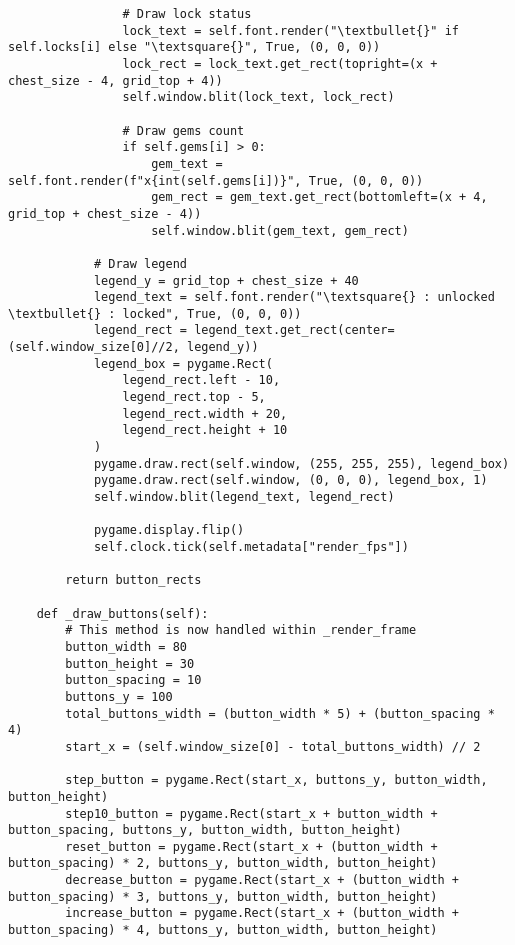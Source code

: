 \begin{lstlisting}
                # Draw lock status
                lock_text = self.font.render("\textbullet{}" if self.locks[i] else "\textsquare{}", True, (0, 0, 0))
                lock_rect = lock_text.get_rect(topright=(x + chest_size - 4, grid_top + 4))
                self.window.blit(lock_text, lock_rect)
                
                # Draw gems count
                if self.gems[i] > 0:
                    gem_text = self.font.render(f"x{int(self.gems[i])}", True, (0, 0, 0))
                    gem_rect = gem_text.get_rect(bottomleft=(x + 4, grid_top + chest_size - 4))
                    self.window.blit(gem_text, gem_rect)
            
            # Draw legend
            legend_y = grid_top + chest_size + 40
            legend_text = self.font.render("\textsquare{} : unlocked     \textbullet{} : locked", True, (0, 0, 0))
            legend_rect = legend_text.get_rect(center=(self.window_size[0]//2, legend_y))
            legend_box = pygame.Rect(
                legend_rect.left - 10, 
                legend_rect.top - 5,
                legend_rect.width + 20,
                legend_rect.height + 10
            )
            pygame.draw.rect(self.window, (255, 255, 255), legend_box)
            pygame.draw.rect(self.window, (0, 0, 0), legend_box, 1)
            self.window.blit(legend_text, legend_rect)
            
            pygame.display.flip()
            self.clock.tick(self.metadata["render_fps"])
        
        return button_rects
    
    def _draw_buttons(self):
        # This method is now handled within _render_frame
        button_width = 80
        button_height = 30
        button_spacing = 10
        buttons_y = 100
        total_buttons_width = (button_width * 5) + (button_spacing * 4)
        start_x = (self.window_size[0] - total_buttons_width) // 2
        
        step_button = pygame.Rect(start_x, buttons_y, button_width, button_height)
        step10_button = pygame.Rect(start_x + button_width + button_spacing, buttons_y, button_width, button_height)
        reset_button = pygame.Rect(start_x + (button_width + button_spacing) * 2, buttons_y, button_width, button_height)
        decrease_button = pygame.Rect(start_x + (button_width + button_spacing) * 3, buttons_y, button_width, button_height)
        increase_button = pygame.Rect(start_x + (button_width + button_spacing) * 4, buttons_y, button_width, button_height)
        

\end{lstlisting}
